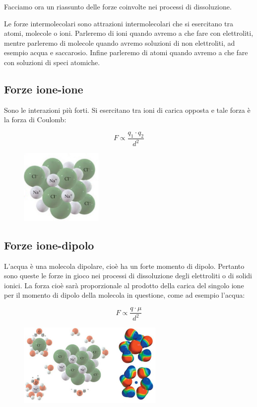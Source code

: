 Facciamo ora un riassunto delle forze coinvolte nei processi di dissoluzione.

Le forze intermolecolari sono attrazioni intermolecolari che si esercitano tra atomi, molecole o ioni. Parleremo di ioni quando avremo a che fare con elettroliti, mentre parleremo di molecole quando avremo soluzioni di non elettroliti, ad esempio acqua e saccarosio. Infine parleremo di atomi quando avremo a che fare con soluzioni di speci atomiche.
\subsection{Forze ione-ione}
Sono le interazioni più forti. Si esercitano tra ioni di carica opposta e tale forza è la forza di Coulomb:

\begin{minipage}{0.5 \textwidth}
    \vspace{1cm}
    $$F \propto \frac{q_1 \cdot q_2}{d^2}$$
\end{minipage}
\begin{minipage}{0.5 \textwidth}
    \begin{figure}[H]
        \includegraphics[width=4cm]{immagini/forze_ione_ione.png}
    \end{figure}
\end{minipage}

\subsection{Forze ione-dipolo}
L'acqua è una molecola dipolare, cioè ha un forte momento di dipolo. Pertanto sono queste le forze in gioco nei processi di dissoluzione degli elettroliti o di solidi ionici. La forza cioè sarà proporzionale al prodotto della carica del singolo ione per il momento di dipolo della molecola in questione, come ad esempio l'acqua:

\begin{minipage}{0.5 \textwidth}
    \vspace{0.2cm}
    $$F \propto \frac{q \cdot \mu}{d^2}$$
\end{minipage}
\begin{minipage}{0.5 \textwidth}
    \begin{figure}[H]
        \includegraphics[width=7cm]{immagini/forze_ione_dipolo.png}
    \end{figure}
\end{minipage}

